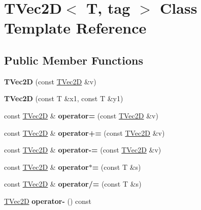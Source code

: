 \hypertarget{classTVec2D}{}\section{T\+Vec2D$<$ T, tag $>$ Class Template Reference}
\label{classTVec2D}
\subsection*{Public Member Functions}
\begin{DoxyCompactItemize}
\item 
\mbox{\label{classTVec2D_aba9c045cd4c742a3e7ac43c2ddcd2fed}} 
{\bfseries T\+Vec2D} (const \hyperlink{classTVec2D}{T\+Vec2D} \&v)
\item 
\mbox{\label{classTVec2D_a57b20a6c93ec114ca8a7eda4124de81a}} 
{\bfseries T\+Vec2D} (const T \&x1, const T \&y1)
\item 
\mbox{\label{classTVec2D_a430c0d8939ccd0335f44910126d9d2d0}} 
const \hyperlink{classTVec2D}{T\+Vec2D} \& {\bfseries operator=} (const \hyperlink{classTVec2D}{T\+Vec2D} \&v)
\item 
\mbox{\label{classTVec2D_aec4287eb58676f57d0b59dfa24bdad72}} 
const \hyperlink{classTVec2D}{T\+Vec2D} \& {\bfseries operator+=} (const \hyperlink{classTVec2D}{T\+Vec2D} \&v)
\item 
\mbox{\label{classTVec2D_aed2f544f20613b79cdaae3ab05d8e7e1}} 
const \hyperlink{classTVec2D}{T\+Vec2D} \& {\bfseries operator-\/=} (const \hyperlink{classTVec2D}{T\+Vec2D} \&v)
\item 
\mbox{\label{classTVec2D_ad100bd516d25020e212511cafdb82109}} 
const \hyperlink{classTVec2D}{T\+Vec2D} \& {\bfseries operator$\ast$=} (const T \&s)
\item 
\mbox{\label{classTVec2D_a3bbdaff7d101fb89027c3c2795ed1681}} 
const \hyperlink{classTVec2D}{T\+Vec2D} \& {\bfseries operator/=} (const T \&s)
\item 
\mbox{\label{classTVec2D_a23e0f577b5fa4422d44a24d6808a9df2}} 
\hyperlink{classTVec2D}{T\+Vec2D} {\bfseries operator-\/} () const

\end{DoxyCompactItemize}
